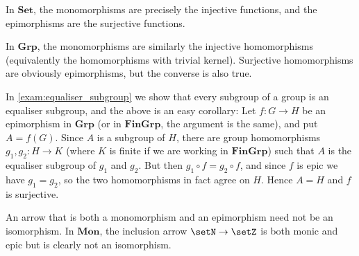 \documentclass[article, a4paper, 11pt, oneside]{memoir}
\numberwithin{equation}{chapter}
\newcommand{\ncat}[1]{\mathbf{#1}} %
\newcommand{\catSet}{\ncat{Set}}
\newcommand{\catGrp}{\ncat{Grp}}
\newcommand{\catMon}{\ncat{Mon}}
\newcommand{\catFinGrp}{\ncat{FinGrp}}
\theoremstyle{myexample}
\theoremstyle{myexamplebreak}
\begin{document}
\begin{examplebreak}
    \begin{enumexample}
        \item In $\catSet$, the monomorphisms are precisely the injective functions, and the epimorphisms are the surjective functions.
        
        \item In $\catGrp$, the monomorphisms are similarly the injective homomorphisms (equivalently the homomorphisms with trivial kernel). Surjective homomorphisms are obviously epimorphisms, but the converse is also true.
        
        In \cref{exam:equaliser_subgroup} we show that every subgroup of a group is an equaliser subgroup, and the above is an easy corollary: Let $f \colon G \to H$ be an epimorphism in $\catGrp$ (or in $\catFinGrp$, the argument is the same), and put $A = f(G)$. Since $A$ is a subgroup of $H$, there are group homomorphisms $g_1, g_2 \colon H \to K$ (where $K$ is finite if we are working in $\catFinGrp$) such that $A$ is the equaliser subgroup of $g_1$ and $g_2$. But then $g_1 \circ f = g_2 \circ f$, and since $f$ is epic we have $g_1 = g_2$, so the two homomorphisms in fact agree on $H$. Hence $A = H$ and $f$ is surjective.

        \item An arrow that is both a monomorphism and an epimorphism need not be an isomorphism. In $\catMon$, the inclusion arrow $\setN \to \setZ$ is both monic and epic but is clearly not an isomorphism.
    \end{enumexample}
\end{examplebreak}


        
        

\end{document}
